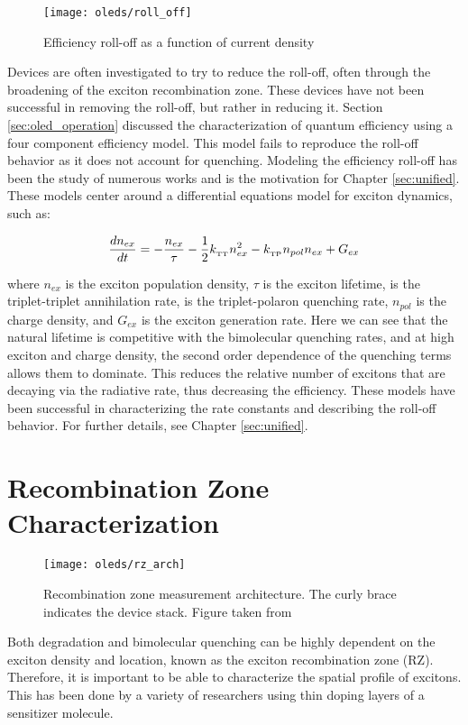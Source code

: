 \documentclass[../thesis.tex]{subfiles}
\begin{document}
\begin{wrapfigure}{r}{.5\textwidth}
\texttt{[image: oleds/roll\_off]}
\caption{Efficiency roll-off as a function of current density}
\label{fig:oleds_rolloff}
\end{wrapfigure}

Devices are often investigated to try to reduce the roll-off, often through the broadening of the exciton recombination zone.\supercite{Wang2015,Murawski2014,Inoue2016,Soofi2017,Chopra2010,Reineke2007a,Lee2009b,Su2008a,Zang2008}
These devices have not been successful in removing the roll-off, but rather in reducing it.
Section \ref{sec:oled_operation} discussed the characterization of quantum efficiency using a four component efficiency model.  
This model fails to reproduce the roll-off behavior as it does not account for quenching.
Modeling the efficiency roll-off has been the study of numerous works and is the motivation for Chapter \ref{sec:unified}.\supercite{Reineke2007,Erickson2014,Hershey2016,Murawski2013}
These models center around a differential equations model for exciton dynamics, such as:

\begin{equation}
\frac{dn_{ex}}{dt} = - \frac{n_{ex}}{\tau}-\frac{1}{2}k_{_\text{\tiny TT}} n_{ex}^2-k_{_\text{\tiny TP}} n_{pol}n_{ex}+G_{ex}
\label{eqn:oleds_exciton_rate}
\end{equation}

where $n_{ex}$ is the exciton population density, $\tau$ is the exciton lifetime, \ktt is the triplet-triplet annihilation rate, \ktp is the triplet-polaron quenching rate, $n_{pol}$ is the charge density, and $G_{ex}$ is the exciton generation rate.
Here we can see that the natural lifetime is competitive with the bimolecular quenching rates, and at high exciton and charge density, the second order dependence of the quenching terms allows them to dominate.
This reduces the relative number of excitons that are decaying via the radiative rate, thus decreasing the efficiency.
These models have been successful in characterizing the rate constants and describing the roll-off behavior.
For further details, see Chapter \ref{sec:unified}.


\section{Recombination Zone Characterization}\label{sec:rz_measurement}
\begin{wrapfigure}{r}{.5\textwidth}
\texttt{[image: oleds/rz\_arch]}
\caption{Recombination zone measurement architecture.  The curly brace indicates the device stack.  Figure taken from \textcite{Erickson2013a}}
\label{fig:oleds_rz_arch}
\end{wrapfigure}
Both degradation and bimolecular quenching can be highly dependent on the exciton density and location, known as the exciton recombination zone (RZ).\supercite{Giebink2006,Giebink2008a,Giebink2008c,Giebink2009a,Reineke2007,Hershey2016,Hershey2017,Bangsund2018}
Therefore, it is important to be able to characterize the spatial profile of excitons.
This has been done by a variety of researchers using thin doping layers of a sensitizer molecule.\supercite{Reineke2007a,Coburn2016a,Coburn2017,Erickson2013a,Hershey2017,Bangsund2018}
\end{document}
